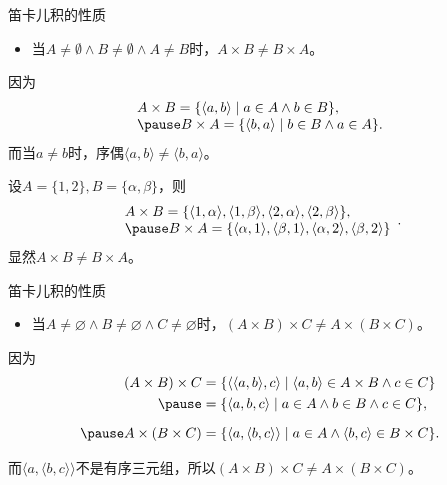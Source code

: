 {\kongbai
\begin{frame}{笛卡儿积的性质}
\pause
\begin{block}{}
\begin{itemize}
  \item 当$A\neq\emptyset \land B\neq\emptyset\land A\neq B$时，\alert{$A\times B\neq B\times A$}。
\end{itemize}
\end{block}\pause

因为
\begin{equation*}\begin{array}{l}
A \times B=\{\langle a, b\rangle \mid a \in A \wedge b \in B\}, \\ \pause
B \times A=\{\langle b, a\rangle \mid b \in B \wedge a \in A\}.
\end{array}\end{equation*}\pause
而当$a\neq b$时，序偶$\langle a, b\rangle \neq\langle b, a\rangle$。

\pause
\begin{exam}
  设$A=\{1,2\},B=\{\alpha,\beta\}$，\pause 则
  $$\begin{array}{l}
A \times B=\{\langle 1, \alpha\rangle,\langle 1, \beta\rangle,\langle 2, \alpha\rangle,\langle 2, \beta\rangle\}, \\\pause
B \times A=\{\langle\alpha, 1\rangle,\langle\beta, 1\rangle,\langle\alpha, 2\rangle,\langle\beta, 2\rangle\}
\end{array}.$$\pause
显然$A\times B\neq B\times A$。
\end{exam}
\end{frame}}

\begin{frame}{笛卡儿积的性质}
\pause
\begin{block}{}
\begin{itemize}
  \item 当$A \neq \varnothing \wedge B \neq \varnothing \wedge C \neq \varnothing$时，\alert{$(A \times B) \times C \neq A \times(B \times C)$}。
\end{itemize}
\end{block}\pause

因为
      \begin{equation*}\begin{aligned}
(A \times B) \times C &=\{\langle\langle a, b\rangle, c\rangle \mid \langle a, b\rangle \in A \times B \wedge c \in C\} \\\pause
&=\{\langle a, b, c\rangle \mid a \in A \wedge b \in B \wedge c \in C\}, \\[6pt]\pause
A \times(B \times C) &=\{\langle a,\langle b, c\rangle\rangle \mid a \in A \wedge\langle b, c\rangle \in B \times C\}.
\end{aligned}\end{equation*}\pause

而$\langle a,\langle b, c\rangle\rangle$不是有序三元组，所以$(A \times B) \times C \neq A \times(B \times C)$。

\end{frame}

